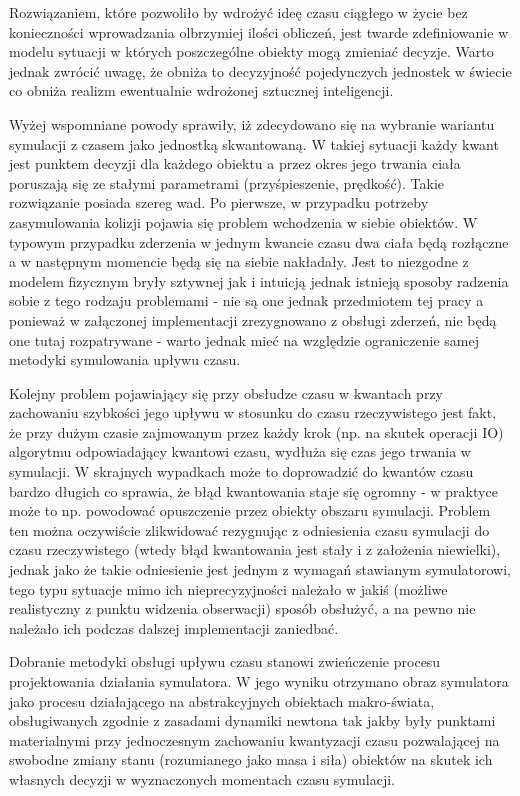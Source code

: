 {{Rozwiązaniem, które pozwoliło by wdrożyć ideę czasu ciągłego w życie bez konieczności wprowadzania olbrzymiej ilości obliczeń, jest twarde zdefiniowanie w modelu sytuacji w których poszczególne obiekty mogą zmieniać decyzje. Warto jednak zwrócić uwagę, że obniża to decyzyjność pojedynczych jednostek w świecie co obniża realizm ewentualnie wdrożonej sztucznej inteligencji.
}
\par{
Wyżej wspomniane powody sprawiły, iż zdecydowano się na wybranie wariantu symulacji z czasem jako jednostką skwantowaną. W takiej sytuacji każdy kwant jest punktem decyzji dla każdego obiektu a przez okres jego trwania ciała poruszają się ze stałymi parametrami (przyśpieszenie, prędkość).
Takie rozwiązanie posiada szereg wad. Po pierwsze, w przypadku potrzeby zasymulowania kolizji pojawia się problem wchodzenia w siebie obiektów. W typowym przypadku zderzenia w jednym kwancie czasu dwa ciała będą rozłączne a w następnym momencie będą się na siebie nakładały. Jest to niezgodne z modelem fizycznym bryły sztywnej jak i intuicją jednak istnieją sposoby radzenia sobie z tego rodzaju problemami - nie są one jednak przedmiotem tej pracy a ponieważ w załączonej implementacji zrezygnowano z obsługi zderzeń, nie będą one tutaj rozpatrywane - warto jednak mieć na względzie ograniczenie samej metodyki symulowania upływu czasu.
}
\par{
Kolejny problem pojawiający się przy obsłudze czasu w kwantach przy zachowaniu szybkości jego upływu w stosunku do czasu rzeczywistego jest fakt, że przy dużym czasie zajmowanym przez każdy krok (np. na skutek operacji IO) algorytmu odpowiadający kwantowi czasu, wydłuża się czas jego trwania w symulacji. W skrajnych wypadkach może to doprowadzić do kwantów czasu bardzo długich co sprawia, że błąd kwantowania staje się ogromny - w praktyce może to np. powodować opuszczenie przez obiekty obszaru symulacji.
Problem ten można oczywiście zlikwidować rezygnując z odniesienia czasu symulacji do czasu rzeczywistego (wtedy błąd kwantowania jest stały i z założenia niewielki), jednak jako że takie odniesienie jest jednym z wymagań stawianym symulatorowi, tego typu sytuacje mimo ich nieprecyzyjności należało w jakiś (możliwe realistyczny z punktu widzenia obserwacji) sposób obsłużyć, a na pewno nie należało ich podczas dalszej implementacji zaniedbać.
}
\par{
Dobranie metodyki obsługi upływu czasu stanowi zwieńczenie procesu projektowania działania symulatora. W jego wyniku otrzymano obraz symulatora jako procesu działającego na abstrakcyjnych obiektach makro-świata, obsługiwanych zgodnie z zasadami dynamiki newtona tak jakby były punktami materialnymi przy jednoczesnym zachowaniu kwantyzacji czasu pozwalającej na swobodne zmiany stanu (rozumianego jako masa i siła) obiektów na skutek ich własnych decyzji w wyznaczonych momentach czasu symulacji.
}

}
